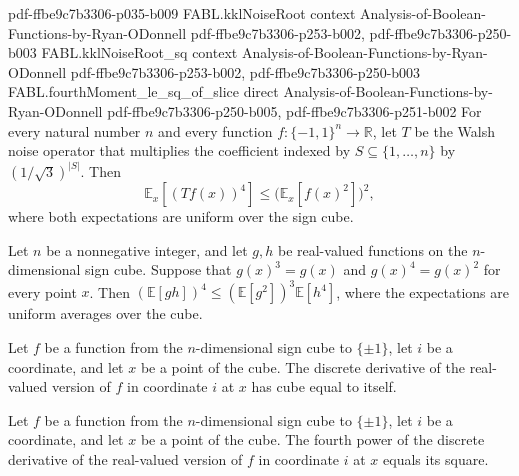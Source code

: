 \begin{theorem}
{    pdf-ffbe9c7b3306-p035-b009}
\proofstep
  {FABL.kklNoiseRoot}
  {context}
  {Analysis-of-Boolean-Functions-by-Ryan-ODonnell}
  {pdf-ffbe9c7b3306-p253-b002,
    pdf-ffbe9c7b3306-p250-b003}
\proofstep
  {FABL.kklNoiseRoot_sq}
  {context}
  {Analysis-of-Boolean-Functions-by-Ryan-ODonnell}
  {pdf-ffbe9c7b3306-p253-b002,
    pdf-ffbe9c7b3306-p250-b003}
\proofstep
  {FABL.fourthMoment_le_sq_of_slice}
  {direct}
  {Analysis-of-Boolean-Functions-by-Ryan-ODonnell}
  {pdf-ffbe9c7b3306-p250-b005,
    pdf-ffbe9c7b3306-p251-b002}
For every natural number $n$ and every function $f:\{−1,1\}^n\to\mathbb R$, let $T$ be
the Walsh noise operator that multiplies the coefficient indexed by
$S\subseteq\{1,\ldots,n\}$ by $(1/\sqrt{3})^{|S|}$. Then
\[
\mathbb E_x[(Tf(x))^4]\leq \bigl(\mathbb E_x[f(x)^2]\bigr)^2,
\]
where both expectations are uniform over the sign cube.
\end{theorem}

\begin{theorem}
\label{FABL.expect_mul_fourth_le_expect_sq_cubed_mul_expect_fourth}
\leanok
{}
Let $n$ be a nonnegative integer, and let $g,h$ be real-valued functions on the
$n$-dimensional sign cube. Suppose that $g(x)^3=g(x)$ and $g(x)^4=g(x)^2$ for every
point $x$. Then $(\mathbb E[gh])^4\le(\mathbb E[g^2])^3\mathbb E[h^4]$, where the
expectations are uniform averages over the cube.
\end{theorem}

\begin{theorem}
\label{FABL.discreteDerivative_toReal_cube}
\leanok
{}
Let $f$ be a function from the $n$-dimensional sign cube to $\{\pm1\}$, let $i$ be a
coordinate, and let $x$ be a point of the cube. The discrete derivative of the
real-valued version of $f$ in coordinate $i$ at $x$ has cube equal to itself.
\end{theorem}

\begin{theorem}
\label{FABL.discreteDerivative_toReal_fourth}
\leanok
{}
Let $f$ be a function from the $n$-dimensional sign cube to $\{\pm1\}$, let $i$ be a
coordinate, and let $x$ be a point of the cube. The fourth power of the discrete
derivative of the real-valued version of $f$ in coordinate $i$ at $x$ equals its square.
\end{theorem}

